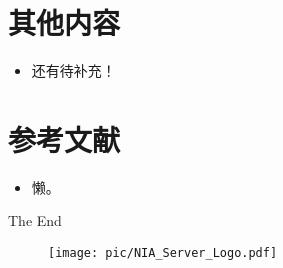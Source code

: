 \documentclass{beamer}
\begin{document}
\section{其他内容}
\begin{frame}
    \begin{itemize}
        \item 还有待补充！
    \end{itemize}
\end{frame}
 
\section{参考文献}
\begin{frame}[allowframebreaks]
    \begin{itemize}
        \item 懒。
    \end{itemize}
\end{frame}

\begin{frame}
    \begin{center}
        {\Huge\calligra The End}
    \end{center}
\end{frame}

\begin{frame}
    \begin{figure}[htpb] 
        \begin{center}
            \texttt{[image: pic/NIA\_Server\_Logo.pdf]}
        \end{center} 
    \end{figure} 
\end{frame}
\end{document}
